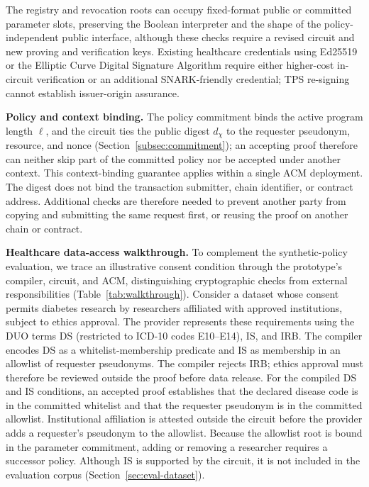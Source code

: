 The registry and revocation roots can occupy fixed-format public or committed parameter slots, preserving the Boolean interpreter and the shape of the policy-independent public interface, although these checks require a revised circuit and new proving and verification keys. Existing healthcare credentials using Ed25519 or the Elliptic Curve Digital Signature Algorithm require either higher-cost in-circuit verification or an additional SNARK-friendly credential; TPS re-signing cannot establish issuer-origin assurance.

\textbf{Policy and context binding.}
The policy commitment binds the active program length $\ell$, and the circuit ties the public digest $d_{\chi}$ to the requester pseudonym, resource, and nonce (Section~\ref{subsec:commitment}); an accepting proof therefore can neither skip part of the committed policy nor be accepted under another context.
This context-binding guarantee applies within a single ACM deployment.
The digest does not bind the transaction submitter, chain identifier, or contract address.
Additional checks are therefore needed to prevent another party from copying and submitting the same request first, or reusing the proof on another chain or contract.

\textbf{Healthcare data-access walkthrough.}
To complement the synthetic-policy evaluation, we trace an illustrative consent condition through the prototype's compiler, circuit, and ACM, distinguishing cryptographic checks from external responsibilities (Table~\ref{tab:walkthrough}).
Consider a dataset whose consent permits diabetes research by researchers affiliated with approved institutions, subject to ethics approval.
The provider represents these requirements using the DUO terms DS (restricted to ICD-10 codes E10--E14), IS, and IRB.
The compiler encodes DS as a whitelist-membership predicate and IS as membership in an allowlist of requester pseudonyms.
The compiler rejects IRB; ethics approval must therefore be reviewed outside the proof before data release.
For the compiled DS and IS conditions, an accepted proof establishes that the declared disease code is in the committed whitelist and that the requester pseudonym is in the committed allowlist.
Institutional affiliation is attested outside the circuit before the provider adds a requester's pseudonym to the allowlist.
Because the allowlist root is bound in the parameter commitment, adding or removing a researcher requires a successor policy.
Although IS is supported by the circuit, it is not included in the evaluation corpus (Section~\ref{sec:eval-dataset}).

